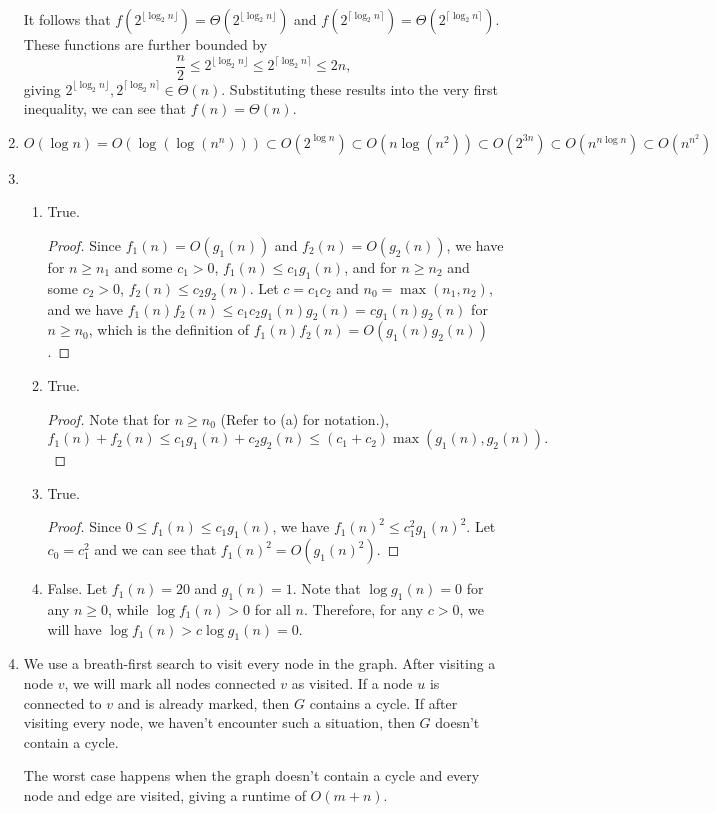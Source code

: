 \documentclass{article}
\begin{document}
\begin{enumerate}
    It follows that $f(2^{\lfloor\log_2 n\rfloor}) = \Theta(2^{\lfloor\log_2 n\rfloor})$ and $f(2^{\lceil\log_2 n\rceil}) = \Theta(2^{\lceil\log_2 n\rceil})$. These functions are further bounded by
    \[
        \frac{n}{2} \le 2^{\lfloor\log_2 n\rfloor} \le 2^{\lceil\log_2 n\rceil} \le 2n,
    \]
    giving $2^{\lfloor\log_2 n\rfloor}, 2^{\lceil\log_2 n\rceil} \in \Theta(n)$. Substituting these results into the very first inequality, we can see that $f(n) = \Theta(n)$.
    \item $O(\log n) = O(\log(\log(n^n))) \subset O(2^{\log n}) \subset O(n\log(n^2)) \subset O(2^{3n}) \subset O(n^{n\log n}) \subset O(n^{n^2})$
    \item
    \begin{enumerate}
        \item True.
        \begin{proof}
            Since $f_1(n) = O(g_1(n))$ and $f_2(n) = O(g_2(n))$, we have for $n \ge n_1$ and some $c_1 > 0$, $f_1(n) \le c_1g_1(n)$, and for $n \ge n_2$ and some $c_2 > 0$, $f_2(n) \le c_2g_2(n)$. Let $c = c_1c_2$ and $n_0 = \max(n_1, n_2)$, and we have $f_1(n)f_2(n) \le c_1c_2g_1(n)g_2(n) = cg_1(n)g_2(n)$ for $n \ge n_0$, which is the definition of $f_1(n)f_2(n) = O(g_1(n)g_2(n))$.
        \end{proof}
        \item True.
        \begin{proof}
            Note that for $n \ge n_0$ (Refer to (a) for notation.),
            \[
                f_1(n) + f_2(n) \le c_1g_1(n) + c_2g_2(n) \le (c_1 + c_2)\max(g_1(n), g_2(n)).
            \]
        \end{proof}
        \item True.
        \begin{proof}
            Since $0 \le f_1(n) \le c_1g_1(n)$, we have $f_1(n)^2 \le c_1^2g_1(n)^2$. Let $c_0 = c_1^2$ and we can see that $f_1(n)^2 = O(g_1(n)^2)$.
        \end{proof}
        \item False. Let $f_1(n) = 20$ and $g_1(n) = 1$. Note that $\log g_1(n) = 0$ for any $n \ge 0$, while $\log f_1(n) > 0$ for all $n$. Therefore, for any $c > 0$, we will have $\log f_1(n) > c\log g_1(n) = 0$.
    \end{enumerate}
    \item We use a breath-first search to visit every node in the graph. After visiting a node $v$, we will mark all nodes connected $v$ as visited. If a node $u$ is connected to $v$ and is already marked, then $G$ contains a cycle. If after visiting every node, we haven't encounter such a situation, then $G$ doesn't contain a cycle.
    
    The worst case happens when the graph doesn't contain a cycle and every node and edge are visited,  giving a runtime of $O(m + n)$.
\end{enumerate}
\end{document}
